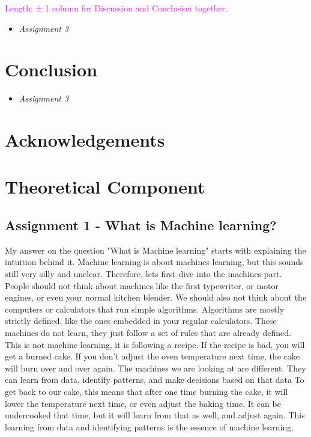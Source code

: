 \documentclass[11pt]{article}
\begin{document}
\textcolor{magenta}{Length: ± 1 column for Discussion and Conclusion together.}

\begin{itemize}
    \item [] \textit{Assignment 3}
\end{itemize}

\section{Conclusion}

\begin{itemize}
    \item [] \textit{Assignment 3}
\end{itemize}






\section*{Acknowledgements}





\clearpage




\section*{Theoretical Component}

\subsection*{Assignment 1 - What is Machine learning?}

My answer on the question "What is Machine learning" starts with explaining the intuition behind it.
Machine learning is about machines learning, but this sounds still very silly and unclear.
Therefore, lets first dive into the machines part.
People should not think about machines like the first typewriter, or motor engines, or even your normal kitchen blender.
We should also not think about the computers or calculators that run simple algorithms.
Algorithms are mostly strictly defined, like the ones embedded in your regular calculators.
These machines do not learn, they just follow a set of rules that are already defined.
This is not machine learning, it is following a recipe.
If the recipe is bad, you will get a burned cake. If you don't adjust the oven temperature next time, the cake will burn over and over again.
The machines we are looking at are different.
They can learn from data, identify patterns, and make decisions based on that data
To get back to our cake, this means that after one time burning the cake, it will lower the temperature next time, or even adjust the baking time.
It can be undercooked that time, but it will learn from that as well, and adjust again.
This learning from data and identifying patterns is the essence of machine learning.
\end{document}
